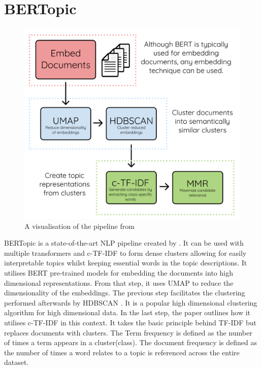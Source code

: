 \documentclass[12pt,MSc,a4paper,oneside]{muthesis}
\begin{document}
\section{BERTopic}

\begin{figure}[h]
    \centering
    \includegraphics[scale=0.3]{images/abstract/BERTopic pipeline.png}
    \caption{A visualisation of the pipeline from \cite{grootendorst2020bertopic}}
\end{figure}

BERTopic is a state-of-the-art NLP pipeline created by \cite{grootendorst2020bertopic}. It can be used with multiple transformers and c-TF-IDF to form dense clusters allowing for easily interpretable topics whilst keeping essential words in the topic descriptions. It utilises BERT pre-trained models for embedding the documents into high dimensional representations. From that step, it uses UMAP \cite{umap} to reduce the dimensionality of the embeddings. The previous step facilitates the clustering performed afterwards by HDBSCAN \cite{hdbscan}. It is a popular high dimensional clustering algorithm for high dimensional data. In the last step, the paper outlines how it utilises c-TF-IDF in this context. It takes the basic principle behind TF-IDF but replaces documents with clusters. The Term frequency is defined as the number of times a term appears in a cluster(class). The document frequency is defined as the number of times a word relates to a topic is referenced across the entire dataset.
\end{document}
